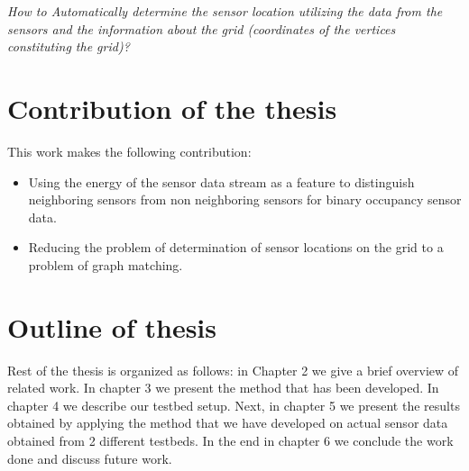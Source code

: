 \textit{How to Automatically determine the sensor location utilizing the data from the sensors and the information about the grid (coordinates of the vertices constituting the grid)?}

\section{Contribution of the thesis}
This work makes the following contribution:
\begin{itemize}
\item Using the energy of the sensor data stream as a feature to distinguish neighboring sensors from non neighboring sensors for binary occupancy sensor data.
\item Reducing the problem of determination of sensor locations  on the grid to a problem of graph matching.
\end{itemize}

\section{Outline of thesis}

Rest of the thesis is organized as follows: in Chapter 2 we give a brief overview of related work. In chapter 3 we present the method that has been developed. In chapter 4 we describe our testbed setup. Next, in chapter 5 we present the results obtained by applying the method that we have developed on actual sensor data obtained from 2 different testbeds. In the end in chapter 6 we conclude the work done and discuss future work.






\vspace{1\baselineskip}

\noindent

